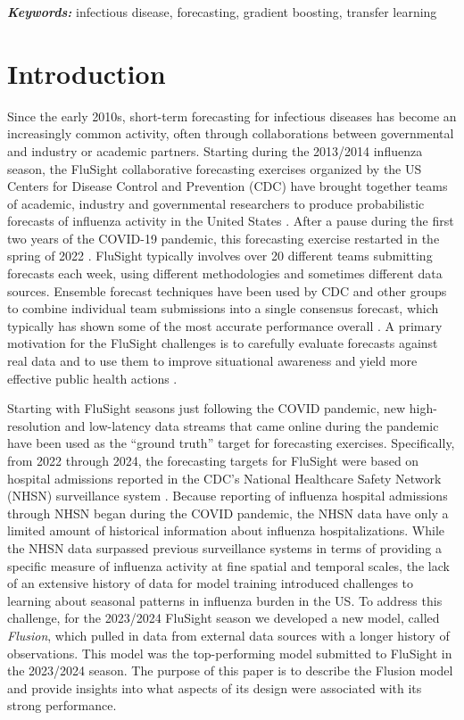 \documentclass{article}\usepackage[]{graphicx}\usepackage[]{xcolor}
\providecommand{\keywords}[1]
{
  \small	
  \textbf{\textit{Keywords:}} #1
}
\begin{document}
\keywords{infectious disease, forecasting, gradient boosting, transfer learning}

\section{Introduction}
\label{sec:intro}

Since the early 2010s, short-term forecasting for infectious diseases has become an increasingly common activity, often through collaborations between governmental and industry or academic partners.
Starting during the 2013/2014 influenza season, the FluSight collaborative forecasting exercises organized by the US Centers for Disease Control and Prevention (CDC) have brought together teams of academic, industry and governmental researchers to produce probabilistic forecasts of influenza activity in the United States \cite{biggerstaff_results_2016}.
After a pause during the first two years of the COVID-19 pandemic, this forecasting exercise restarted in the spring of 2022 \cite{us_centers_for_disease_control_and_prevention_flusight_2023}.
FluSight typically involves over 20 different teams submitting forecasts each week, using different methodologies and sometimes different data sources.
Ensemble forecast techniques have been used by CDC and other groups to combine individual team submissions into a single consensus forecast, which typically has shown some of the most accurate performance overall \cite{mcgowan_collaborative_2019,reich_accuracy_2019}.
A primary motivation for the FluSight challenges is to carefully evaluate forecasts against real data and to use them to improve situational awareness and yield more effective public health actions \cite{lutz_applying_2019}.

Starting with FluSight seasons just following the COVID pandemic, new high-resolution and low-latency data streams that came online during the pandemic have been used as the ``ground truth'' target for forecasting exercises. 
Specifically, from 2022 through 2024, the forecasting targets for FluSight were based on hospital admissions reported in the CDC’s National Healthcare Safety Network (NHSN) surveillance system \cite{cdc_flusurveillance_overview}.
Because reporting of influenza hospital admissions through NHSN began during the COVID pandemic, the NHSN data have only a limited amount of historical information about influenza hospitalizations.
While the NHSN data surpassed previous surveillance systems in terms of providing a specific measure of influenza activity at fine spatial and temporal scales, the lack of an extensive history of data for model training introduced challenges to learning about seasonal patterns in influenza burden in the US.  
To address this challenge, for the 2023/2024 FluSight season we developed a new model, called \emph{Flusion}, which pulled in data from external data sources with a longer history of observations.  
This model was the top-performing model submitted to FluSight in the 2023/2024 season.  
The purpose of this paper is to describe the Flusion model and provide insights into what aspects of its design were associated with its strong performance.
\end{document}
